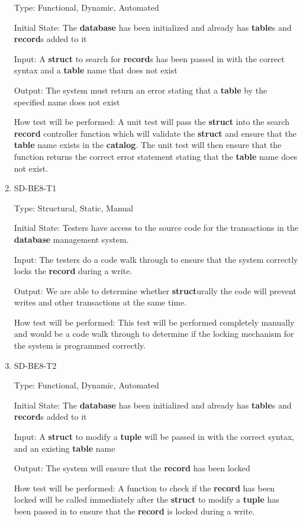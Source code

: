 \documentclass[12pt, titlepage]{article}
\begin{document}
\begin{enumerate}
Type: Functional, Dynamic, Automated
					
Initial State: The \textbf{database} has been initialized and already has \textbf{table}s and \textbf{record}s added to it
					
Input: A \textbf{struct} to search for \textbf{record}s has been passed in with the correct syntax and a \textbf{table} name that does not exist
					
Output: The system must return an error stating that a \textbf{table} by the specified name does not exist
					
How test will be performed: A unit test will pass the \textbf{struct} into the search \textbf{record} controller function which will validate the \textbf{struct} and ensure that the \textbf{table} name exists in the \textbf{catalog}. The unit test will then ensure that the function returns the correct error statement stating that the \textbf{table} name does not exist.

\item{SD-BE8-T1}

Type: Structural, Static, Manual
					
Initial State: Testers have access to the source code for the transactions in the \textbf{database} management system.
					
Input: The testers do a code walk through to ensure that the system correctly locks the \textbf{record} during a write.
					
Output: We are able to determine whether \textbf{struct}urally the code will prevent writes and other transactions at the same time.
					
How test will be performed: This test will be performed completely manually and would be a code walk through to determine if the locking mechanism for the system is programmed correctly.

\item{SD-BE8-T2}

Type: Functional, Dynamic, Automated
					
Initial State: The \textbf{database} has been initialized and already has \textbf{table}s and \textbf{record}s added to it
					
Input: A \textbf{struct} to modify a \textbf{tuple} will be passed in with the correct syntax, and an existing \textbf{table} name
					
Output: The system will ensure that the \textbf{record} has been locked
					
How test will be performed: A function to check if the \textbf{record} has been locked will be called immediately after the \textbf{struct} to modify a \textbf{tuple} has been passed in to ensure that the \textbf{record} is locked during a write.


\end{enumerate}
\end{document}
